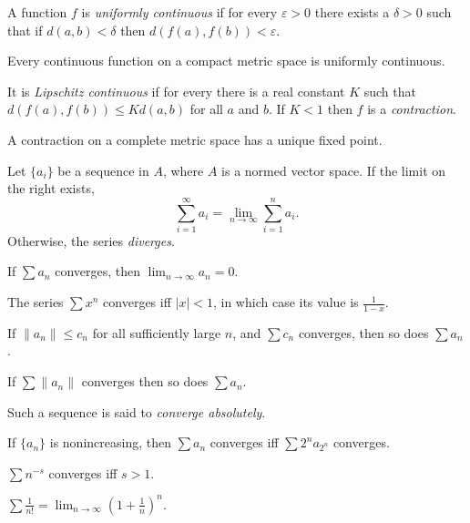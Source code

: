 \begin{defn}
  A function $f$ is \emph{uniformly continuous} if for every $\varepsilon>0$
  there exists a $\delta>0$ such that if $d(a,b)<\delta$ then
  $d(f(a),f(b))<\varepsilon$.
\end{defn}
\begin{thm}
    Every continuous function on a compact metric space is uniformly continuous.
\end{thm}
\begin{defn}
  It is \emph{Lipschitz continuous} if for every
  there is a real constant $K$ such that $d(f(a),f(b))\le Kd(a,b)$ for all $a$
  and $b$. If $K<1$ then $f$ is a \emph{contraction}.
\end{defn}
\begin{prop}
    A contraction on a complete metric space has a unique fixed point.
\end{prop}
\begin{defn}
    Let $\{a_i\}$ be a sequence in $A$, where $A$ is a normed vector space.
    If the limit on the right exists,
    \[\sum_{i=1}^\infty a_i=\lim_{n\to\infty}\sum_{i=1}^n a_i.\]
    Otherwise, the series \emph{diverges}.
\end{defn}
\begin{prop}
    If $\sum a_n$ converges, then $\lim_{n\to\infty} a_n=0$.
\end{prop}
\begin{prop}
    The series $\sum x^n$ converges iff $|x|<1$, in which case its value is
    $\frac{1}{1-x}$.
\end{prop}
\begin{prop}
    If $\|a_n\|\le c_n$ for all sufficiently large $n$, and $\sum c_n$ converges,
    then so does $\sum a_n$.
\end{prop}
\begin{cor}
    If $\sum\|a_n\|$ converges then so does $\sum a_n$.
\end{cor}
\begin{defn}
    Such a sequence is said to \emph{converge absolutely}.
\end{defn}
\begin{prop}
    If $\{a_n\}$ is nonincreasing, then $\sum a_n$ converges iff $\sum 2^n
    a_{2^n}$ converges.
\end{prop}
\begin{cor}
    $\sum n^{-s}$ converges iff $s>1$.
\end{cor}
\begin{prop}
    $\sum\frac 1{n!}=\lim_{n\to\infty}\left(1+\frac 1n\right)^n$.
\end{prop}
